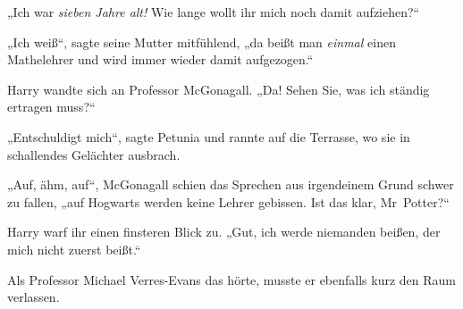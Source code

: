 „Ich war \emph{sieben Jahre alt!} Wie lange wollt ihr mich noch damit aufziehen?“

„Ich weiß“, sagte seine Mutter mitfühlend, „da beißt man \emph{einmal} einen Mathelehrer und wird immer wieder damit aufgezogen.“

Harry wandte sich an Professor McGonagall. „Da! Sehen Sie, was ich ständig ertragen muss?“

„Entschuldigt mich“, sagte Petunia und rannte auf die Terrasse, wo sie in schallendes Gelächter ausbrach.

„Auf, ähm, auf“, McGonagall schien das Sprechen aus irgendeinem Grund schwer zu fallen, „auf Hogwarts werden keine Lehrer gebissen. Ist das klar, Mr~Potter?“

Harry warf ihr einen finsteren Blick zu. „Gut, ich werde niemanden beißen, der mich nicht zuerst beißt.“

Als Professor Michael Verres-Evans das hörte, musste er ebenfalls kurz den Raum verlassen.

